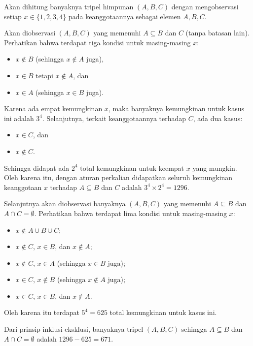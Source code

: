 

\begin{solusi}
    Akan dihitung banyaknya tripel himpunan $(A,B,C)$ dengan mengobservasi setiap $x \in \{1,2,3,4\}$ pada keanggotaannya sebagai elemen $A,B,C$. 
    
    Akan diobservasi $(A,B,C)$ yang memenuhi $A \subseteq B$ dan $C$ (tanpa batasan lain). Perhatikan bahwa terdapat tiga kondisi untuk masing-masing $x$:
    \begin{itemize}
        \item $x \not \in B$ (sehingga $x \not \in A$ juga),
        \item $x \in B$ tetapi $x \not \in A$, dan
        \item $x \in A$ (sehingga $x \in B$ juga).
    \end{itemize}
    Karena ada empat kemungkinan $x$, maka banyaknya kemungkinan untuk kasus ini adalah $3^4$. Selanjutnya, terkait keanggotaannya terhadap $C$, ada dua kasus:
    \begin{itemize}
        \item $x \in C$, dan
        \item $x \not \in C$.
    \end{itemize}
    Sehingga didapat ada $2^4$ total kemungkinan  untuk keempat $x$ yang mungkin. 
    Oleh karena itu, dengan aturan perkalian didapatkan seluruh kemungkinan keanggotaan $x$ terhadap $A \subseteq B$ dan $C$ adalah $3^4 \times 2^4 = 1296$.

    Selanjutnya akan diobservasi banyaknya $(A,B,C)$ yang memenuhi $A \subseteq B$ dan $A \cap C = \emptyset$. Perhatikan bahwa terdapat lima kondisi untuk masing-masing $x$:
    \begin{itemize}
        \item $x \not \in A \cup B \cup C$;
        \item $x \not \in C$, $x \in B$, dan $x \not \in A$;
        \item $x \not \in C$, $x \in A$ (sehingga $x \in B$ juga);
        \item $x \in C$, $x \not \in B$ (sehingga $x \not \in A$ juga);
        \item $x \in C$, $x \in B$, dan $x \not \in A$.
    \end{itemize}
    Oleh karena itu terdapat $5^4 = 625$ total kemungkinan untuk kasus ini.

    Dari prinsip inklusi eksklusi, banyaknya tripel $(A,B,C)$ sehingga $A \subseteq B$ dan $A \cap C = \emptyset$ adalah $1296 - 625 = \boxed{671}$.
\end{solusi}